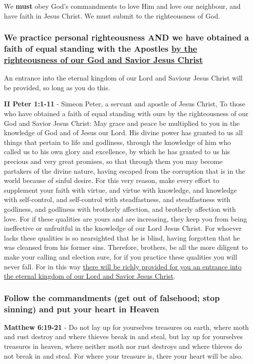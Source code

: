 \documentclass[11pt]{article}
\begin{document}
We \textbf{must} obey God's commandments to love Him and love our neighbour, and have faith in Jesus Christ.
We must submit to the righteousness of God.

\subsubsection{We practice personal righteousness AND we have obtained a faith of equal standing with the Apostles \underline{by the righteousness of our God and Savior Jesus Christ}}
\label{sec:org585de7c}
An entrance into the eternal kingdom of our Lord and Saviour Jesus Christ will
be provided, so long as you do this.

\textbf{II Peter 1:1-11} - Simeon Peter, a servant and apostle of Jesus Christ, To those who have obtained a faith of equal standing with ours by the righteousness of our God and Savior Jesus Christ: May grace and peace be multiplied to you in the knowledge of God and of Jesus our Lord.  His divine power has granted to us all things that pertain to life and godliness, through the knowledge of him who called us to his own glory and excellence, by which he has granted to us his precious and very great promises, so that through them you may become partakers of the divine nature, having escaped from the corruption that is in the world because of sinful desire.  For this very reason, make every effort to supplement your faith with virtue, and virtue with knowledge, and knowledge with self-control, and self-control with steadfastness, and steadfastness with godliness, and godliness with brotherly affection, and brotherly affection with love.  For if these qualities are yours and are increasing, they keep you from being ineffective or unfruitful in the knowledge of our Lord Jesus Christ.  For whoever lacks these qualities is so nearsighted that he is blind, having forgotten that he was cleansed from his former sins.  Therefore, brothers, be all the more diligent to make your calling and election sure, for if you practice these qualities you will never fall.  For in this way \uline{there will be richly provided for you an entrance into the eternal kingdom of our Lord and Savior Jesus Christ}.

\subsubsection{Follow the commandments (get out of falsehood; stop sinning) and put your heart in Heaven}
\label{sec:org0aac980}
\textbf{Matthew 6:19-21} - Do not lay up for yourselves treasures on earth, where moth and rust destroy and where thieves break in and steal, but lay up for yourselves treasures in heaven, where neither moth nor rust destroys and where thieves do not break in and steal. For where your treasure is, there your heart will be also.
\end{document}
